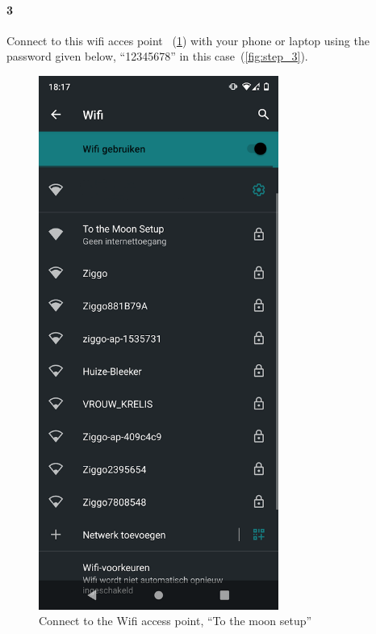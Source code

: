 \documentclass[11pt]{article}
\begin{document}
    \paragraph{3} Connect to this wifi acces point ~(\textcolor{blue}{\cref{fig:step_2}}) with your phone or laptop using the password given below, ``12345678'' in this case~(\textcolor{blue}{\cref{fig:step_3}}).
    \begin{figure}[H]
        \centering
        \begin{minipage}{0.45\textwidth}
            \centering
            \includegraphics[width=0.7\textwidth]{step_2}
            \caption{Connect to the Wifi access point, ``To the moon setup''}
            \label{fig:step_2}
        \end{minipage}\hfill

\end{figure}
\end{document}
